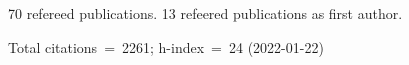 70 refereed publications. 13 refeered publications as first author.

Total citations~=~2261; h-index~=~24 (2022-01-22)